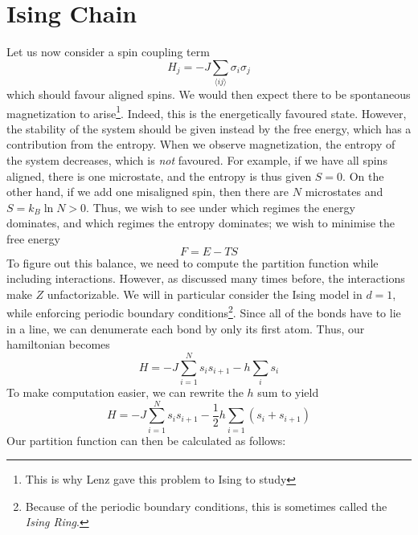 \section{Ising Chain}
Let us now consider a spin coupling term
\[H_j = -J\sum_{\langle ij\rangle} \sigma_i\sigma_j\]
which should favour aligned spins. We would then expect there to be spontaneous magnetization to arise\footnote{This is why Lenz gave this problem to Ising to study}. Indeed, this is the energetically favoured state. However, the stability of the system should be given instead by the free energy, which has a contribution from the entropy. When we observe magnetization, the entropy of the system decreases, which is \emph{not} favoured. For example, if we have all spins aligned, there is one microstate, and the entropy is thus given \(S=0\). On the other hand, if we add one misaligned spin, then there are \(N\) microstates and \(S = k_B\ln N>0\). Thus, we wish to see under which regimes the energy dominates, and which regimes the entropy dominates; we wish to minimise the free energy
\[F = E-TS\]
To figure out this balance, we need to compute the partition function while including interactions. However, as discussed many times before, the interactions make \(Z\) unfactorizable. We will in particular consider the Ising model in \(d=1\), while enforcing periodic boundary conditions\footnote{Because of the periodic boundary conditions, this is sometimes called the \emph{Ising Ring}.}. Since all of the bonds have to lie in a line, we can denumerate each bond by only its first atom. Thus, our hamiltonian becomes
\[H = -J\sum_{i=1}^Ns_is_{i+1}-h\sum_is_i\]
To make computation easier, we can rewrite the \(h\) sum to yield
\begin{equation}
	H = -J\sum_{i=1}^{N}s_is_{i+1}-\frac{1}{2}h\sum_{i=1}(s_i+s_{i+1})
\end{equation}
Our partition function can then be calculated as follows:
